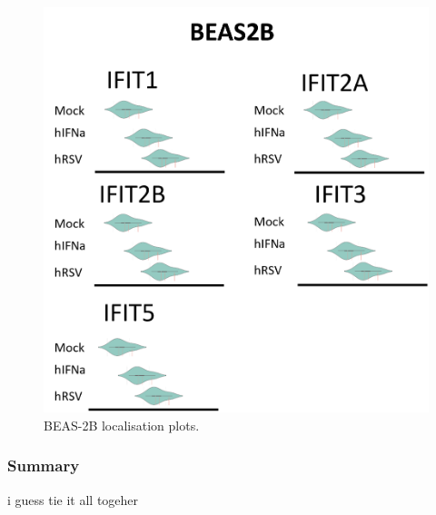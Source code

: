 \begin{figure}
    \centering
    \includegraphics[width=1\linewidth]{06. Chapter 1/Figs/02. Localisation/04. beas2b plots.png}
    \caption[BEAS-2B localisation plots.]{BEAS-2B localisation plots.}
    \label{BEAS-2B localisation plots.}
\end{figure}


\subsubsection*{Summary} \label{Summary-human-localisation}
i guess tie it all togeher
